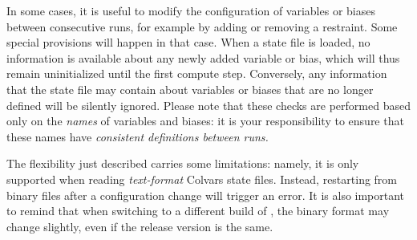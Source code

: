 


In some cases, it is useful to modify the configuration of variables or biases between consecutive runs, for example by adding or removing a restraint.
Some special provisions will happen in that case.
When a state file is loaded, no information is available about any newly added variable or bias, which will thus remain uninitialized until the first compute step.
Conversely, any information that the state file may contain about variables or biases that are no longer defined will be silently ignored.
Please note that these checks are performed based only on the \emph{names} of variables and biases: it is your responsibility to ensure that these names have \emph{consistent definitions between runs.}

The flexibility just described carries some limitations: namely, it is only supported when reading \emph{text-format} Colvars state files.
Instead, restarting from binary files after a configuration change will trigger an error.
It is also important to remind that when switching to a different build of \MDENGINE, the binary format may change slightly, even if the release version is the same.

